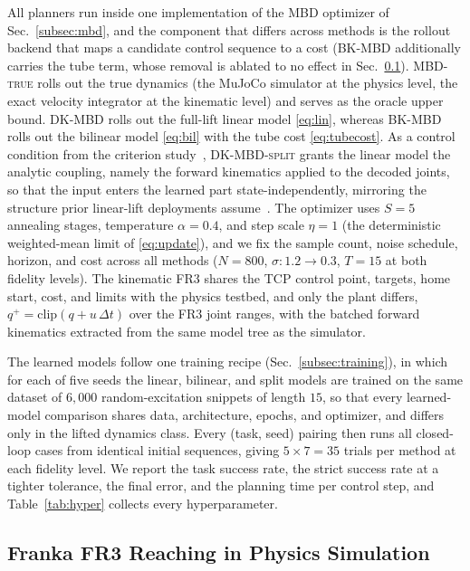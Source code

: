 \documentclass[letterpaper,10pt,conference]{ieeeconf}
\newcommand{\mbdtrue}{\textsc{MBD-true}}
\newcommand{\dkmbd}{\textsc{DK-MBD}}
\newcommand{\dksplit}{\textsc{DK-MBD-split}}
\newcommand{\bkmbd}{\textsc{BK-MBD}}
\begin{document}
All planners run inside one implementation of the MBD optimizer of Sec.~\ref{subsec:mbd}, and the component that differs across methods is the rollout backend that maps a candidate control sequence to a cost (\bkmbd{} additionally carries the tube term, whose removal is ablated to no effect in Sec.~\ref{subsec:exp_franka}).
\mbdtrue{} rolls out the true dynamics (the MuJoCo simulator at the physics level, the exact velocity integrator at the kinematic level) and serves as the oracle upper bound.
\dkmbd{} rolls out the full-lift linear model \eqref{eq:lin}, whereas \bkmbd{} rolls out the bilinear model \eqref{eq:bil} with the tube cost \eqref{eq:tubecost}.
As a control condition from the criterion study~\cite{kim2026bilinear}, \dksplit{} grants the linear model the analytic coupling, namely the forward kinematics applied to the decoded joints, so that the input enters the learned part state-independently, mirroring the structure prior linear-lift deployments assume~\cite{mppidk2026, korda2018mpc}.
The optimizer uses $S = 5$ annealing stages, temperature $\alpha = 0.4$, and step scale $\eta = 1$ (the deterministic weighted-mean limit of \eqref{eq:update}), and we fix the sample count, noise schedule, horizon, and cost across all methods ($N = 800$, $\sigma\!: 1.2 \to 0.3$, $T = 15$ at both fidelity levels).
The kinematic FR3 shares the TCP control point, targets, home start, cost, and limits with the physics testbed, and only the plant differs, $q^{+} = \mathrm{clip}(q + u\,\Delta t)$ over the FR3 joint ranges, with the batched forward kinematics extracted from the same model tree as the simulator.

The learned models follow one training recipe (Sec.~\ref{subsec:training}), in which for each of five seeds the linear, bilinear, and split models are trained on the same dataset of $6{,}000$ random-excitation snippets of length $15$, so that every learned-model comparison shares data, architecture, epochs, and optimizer, and differs only in the lifted dynamics class.
Every (task, seed) pairing then runs all closed-loop cases from identical initial sequences, giving $5 \times 7 = 35$ trials per method at each fidelity level.
We report the task success rate, the strict success rate at a tighter tolerance, the final error, and the planning time per control step, and Table~\ref{tab:hyper} collects every hyperparameter.



\subsection{Franka FR3 Reaching in Physics Simulation}\label{subsec:exp_franka}
\end{document}
